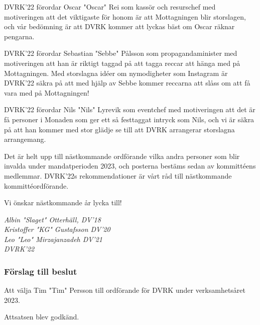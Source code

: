 \documentclass[protokoll]{dvd}
\begin{document}
DVRK'22 förordar Oscar "Oscar" Rei som kassör och resurschef med motiveringen att det viktigaste för honom är att Mottagningen blir storslagen, och vår bedömning är att DVRK kommer att lyckas bäst om Oscar räknar pengarna.

DVRK'22 förordar Sebastian "Sebbe" Pålsson som propagandaminister med motiveringen att han är riktigt taggad på att tagga reccar att hänga med på Mottagningen.
Med storslagna idéer om nymodigheter som Instagram är DVRK'22 säkra på att med hjälp av Sebbe kommer reccarna att slåss om att få vara med på Mottagningen!

DVRK'22 förordar Nils "Nils" Lyrevik som eventchef med motiveringen att det är få personer i Monaden som ger ett så festtaggat intryck som Nils, och vi är säkra på att han kommer med stor glädje se till att DVRK arrangerar storslagna arrangemang.

Det är helt upp till nästkommande ordförande vilka andra personer som blir invalda under mandatperioden 2023, och posterna bestäms sedan av kommittéens medlemmar.
DVRK'22s rekommendationer är vårt råd till nästkommande kommittéordförande.

Vi önskar nästkommande år lycka till!

\emph{Albin "Slaget" Otterhäll, DV'18} \\
\emph{Kristoffer "KG" Gustafsson DV'20} \\
\emph{Leo "Leo" Mirzajanzadeh DV'21}\\
\emph{DVRK'22}

\subsubsection*{Förslag till beslut}
\begin{attsatser}
    \item Att välja Tim "Tim" Persson till ordförande för DVRK under verksamhetsåret 2023.
\end{attsatser}

Attsatsen blev godkänd.

\end{document}
